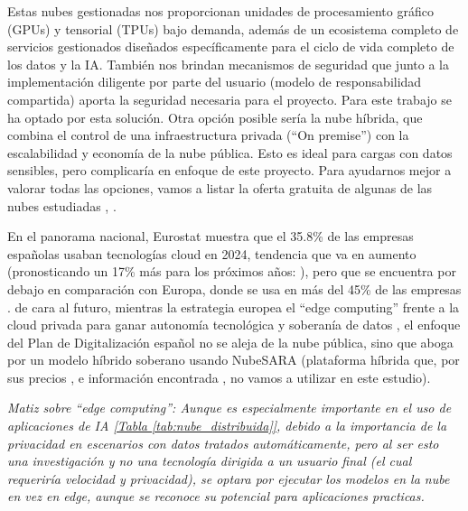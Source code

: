 Estas nubes gestionadas nos proporcionan unidades de procesamiento gráfico (GPUs) y tensorial (TPUs) bajo demanda, además de un ecosistema completo de servicios gestionados diseñados específicamente para el ciclo de vida completo de los datos y la IA. También nos brindan mecanismos de seguridad que junto a la implementación diligente por parte del usuario (modelo de responsabilidad compartida) aporta la seguridad necesaria para el proyecto. Para este trabajo se ha optado por esta solución.
Otra opción posible sería la nube híbrida, que combina el control de una infraestructura privada (``On premise'') con la escalabilidad y economía de la nube pública. Esto es ideal para cargas con datos sensibles, pero complicaría en enfoque de este proyecto. 
Para ayudarnos mejor a valorar todas las opciones, vamos a listar la oferta gratuita de algunas de las nubes estudiadas \citep{MicrosoftCloudTerminology}, \citep{lisdorf2021cloud}.

En el panorama nacional, Eurostat muestra que el 35.8\% de las empresas españolas usaban tecnologías cloud en 2024, tendencia que va en aumento (pronosticando un 17\% más para los próximos años: \cite{EspannaCloudGroeth2033}), pero que se encuentra por debajo en comparación con Europa, donde se usa en más del 45\% de las empresas \citep{EurostatCloudUsage}. de cara al futuro, mientras la estrategia europea el ``edge computing'' frente a la cloud privada para ganar autonomía tecnológica y soberanía de datos \citep{EuroDigitalStrategyEdge}, el enfoque del Plan de Digitalización español \citep{GobEspana2021PlanDigitalizacion} no se aleja de la nube pública, sino que aboga por un modelo híbrido soberano usando NubeSARA (plataforma híbrida que, por sus precios \citep{EurostatCloudUsage}, e información encontrada \citep{InfoNubeSARA}, \citep{InfoPreparaTICNubeSARA} no vamos a utilizar en este estudio).

\emph{Matiz sobre ``edge computing'': Aunque es especialmente importante en el uso de aplicaciones de IA  \hyperref[tab:nube_distribuida]{[Tabla \ref*{tab:nube_distribuida}]}, debido a la importancia de la privacidad en escenarios con datos tratados automáticamente, pero al ser esto una investigación y no una tecnología dirigida a un usuario final (el cual requeriría velocidad y privacidad), se optara por ejecutar los modelos en la nube en vez en edge, aunque se reconoce su potencial para aplicaciones practicas.}

